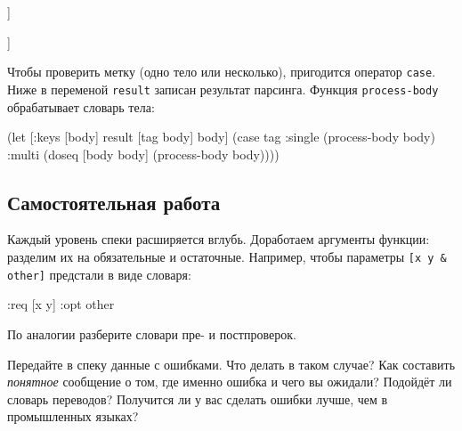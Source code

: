 \ifx\DEVICETYPE\MOBILE

\begin{english}
  \begin{clojure}
[:multi [{:args [x]
          :code [(println 1)]}
         {:args [x y]
          :code [(println 2)]}]]
  \end{clojure}
\end{english}

\else

\begin{english}
  \begin{clojure}
[:multi [{:args [x] :code [(println 1)]}
         {:args [x y] :code [(println 2)]}]]
  \end{clojure}
\end{english}

\fi

Чтобы проверить метку (одно тело или несколько), пригодится оператор
\verb|case|. Ниже в переменой \verb|result| записан результат
парсинга. Функция \verb|process-body| обрабатывает словарь тела:

\begin{english}
  \begin{clojure}
(let [{:keys [body]} result
      [tag body] body]
  (case tag
    :single
    (process-body body)
    :multi
    (doseq [body body]
      (process-body body))))
  \end{clojure}
\end{english}

\subsection{Самостоятельная работа}


Каждый уровень спеки расширяется вглубь. Доработаем аргументы функции: разделим
их на обязательные и остаточные. Например, чтобы параметры \verb|[x y & other]|
предстали в виде словаря:

\begin{english}
  \begin{clojure}
{:req [x y] :opt other}
  \end{clojure}
\end{english}

\noindent
По аналогии разберите словари пре- и постпроверок.

Передайте в спеку данные с ошибками. Что делать в таком случае? Как составить
\emph{понятное} сообщение о том, где именно ошибка и чего вы ожидали? Подойдёт ли
словарь переводов? Получится ли у вас сделать ошибки лучше, чем в промышленных
языках?

